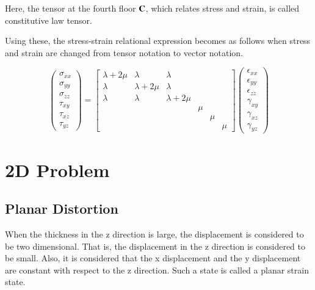 Here, the tensor at the fourth floor $\mathbf{C}$, which relates stress and strain, is called constitutive law tensor.

Using these, the stress-strain relational expression becomes as follows when stress and strain are changed from tensor notation to vector notation.

\begin{equation}
\left(\begin{array}{l}
\sigma_{xx}\\
\sigma_{yy}\\
\sigma_{zz}\\
\tau_{xy}\\
\tau_{xz}\\
\tau_{yz}
\end{array}\right)
=\left[\begin{array}{llllll}
\lambda+2\mu & \lambda & \lambda & & & \\
\lambda & \lambda+2\mu & \lambda & & & \\
\lambda & \lambda & \lambda+2\mu & & & \\
& & & \mu &   & \\
& & &    & \mu & \\
& & &    &    & \mu
\end{array}\right]
\left(\begin{array}{l}
\epsilon_{xx}\\
\epsilon_{yy}\\
\epsilon_{zz}\\
\gamma_{xy}\\
\gamma_{xz}\\
\gamma_{yz}
\end{array}\right)
\end{equation}


\section{2D Problem}


\subsection{Planar Distortion}


When the thickness in the z direction is large, the displacement is considered to be two dimensional. That is, the displacement in the z direction is considered to be small. Also, it is considered that the x displacement and the y displacement are constant with respect to the z direction. Such a state is called a planar strain state.


